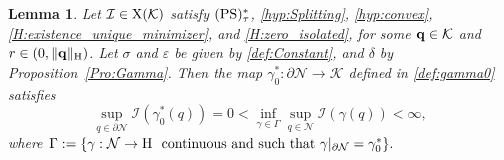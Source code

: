 \documentclass{article}
\newcommand{\boK}{\mathcal{K}}
\newcommand{\boI}{\mathcal{I}}
\newcommand{\boN}{\mathcal{N}}
\newcommand{\Hilb}{{\textnormal H}}
\newcommand{\minq}{{\bf q}}
\newcommand{\X}{{\textnormal X}}
\newcommand{\PS}{(\textnormal{PS})^{*}_\tau}
\newtheorem{lemma}{Lemma}[section]
\theoremstyle{definition}
\begin{document}
\begin{lemma}\label{Lemma:MountainPass}
Let $\boI\in\X(\boK)$ satisfy $\PS$, \eqref{hyp:Splitting}, \eqref{hyp:convex}, \eqref{H:existence_unique_minimizer}, and \eqref{H:zero_isolated}, for some $\minq\in\boK$ and $r\in(0,\|\minq\|_\Hilb)$. Let $\sigma$ and $\varepsilon$ be given by \eqref{def:Constant}, and $\delta$ by Proposition~\ref{Pro:Gamma}. Then the map $\gamma_0^*:\partial\boN\to\boK$ defined in \eqref{def:gamma0} satisfies
\begin{equation}\label{eq:MountainPassCondition}
\sup_{q\in\partial\boN}\boI(\gamma_0^*(q))=0<\inf_{\gamma\in\Gamma}\sup_{q\in\boN}\boI(\gamma(q))<\infty,
\end{equation}
where $
    \Gamma:=\{\gamma:\boN\to\Hilb\ \hbox{ continuous and such that }\gamma|_{\partial\boN}=\gamma_0^*\}.$
\end{lemma}
\end{document}
